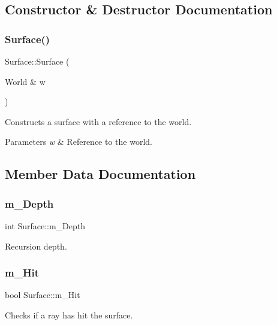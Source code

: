 \subsection{Constructor \& Destructor Documentation}
\hypertarget{class_surface_a09333b09d58a9c1a23903c5bc21ba425}{}\label{class_surface_a09333b09d58a9c1a23903c5bc21ba425} 
\subsubsection{\texorpdfstring{Surface()}{Surface()}}
{\footnotesize\ttfamily Surface\+::\+Surface (\begin{DoxyParamCaption}\item[{World \&}]{w }\end{DoxyParamCaption})}

Constructs a surface with a reference to the world. 
\begin{DoxyParams}{Parameters}
{\em w} & Reference to the world. \\
\hline
\end{DoxyParams}


\subsection{Member Data Documentation}
\hypertarget{class_surface_a07d2132be1f81e87f7a8d6228e2457c1}{}\label{class_surface_a07d2132be1f81e87f7a8d6228e2457c1} 
\subsubsection{\texorpdfstring{m\+\_\+\+Depth}{m\_Depth}}
{\footnotesize\ttfamily int Surface\+::m\+\_\+\+Depth}

Recursion depth. \hypertarget{class_surface_a5fcd1d25c1f67289f4167242c685693c}{}\label{class_surface_a5fcd1d25c1f67289f4167242c685693c} 
\subsubsection{\texorpdfstring{m\+\_\+\+Hit}{m\_Hit}}
{\footnotesize\ttfamily bool Surface\+::m\+\_\+\+Hit}

Checks if a ray has hit the surface. \hypertarget{class_surface_ab3cf728434195ae6b569604d90b05bcd}{}\label{class_surface_ab3cf728434195ae6b569604d90b05bcd} 
